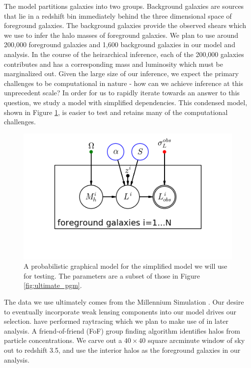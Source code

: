 \documentclass[\docopts]{\docclass}
\begin{document}
The model partitions galaxies into two groups. 
Background galaxies are sources that lie in a redshift bin immediately behind the three dimensional space of foreground galaxies. 
The background galaxies provide the observed shears which we use to infer the halo masses of foreground galaxies. 
We plan to use around 200,000 foreground galaxies and 1,600 background galaxies in our model and analysis. 
In the course of the heirarchical inference, each of the 200,000 galaxies contributes and has a corresponding mass and luminosity which must be marginalized out. 
Given the large size of our inference, we expect the primary challenges to be computational in nature - how can we achieve inference at this unprecedent scale?
In order for us to rapidly iterate towards an answer to this question, we study a model with simplified dependencies.
This condensed model, shown in Figure \ref{fig:simplified_pgm}, is easier to test and retains many of the computational challenges. 

\begin{figure}[h]
\centering
\includegraphics[width=0.9\columnwidth]{simplified_pgm.png}
\caption{
A probabilistic graphical model for the simplified model we will use for testing.
The parameters are a subset of those in Figure \ref{fig:ultimate_pgm}.
\label{fig:simplified_pgm}}
\end{figure}

The data we use ultimately comes from the Millennium Simulation \citep{millennium}. 
Our desire to eventually incorporate weak lensing components into our model drives our selection. 
\citet{raytracing} have performed raytracing which we plan to make use of in later analysis. 
A friend-of-friend (FoF) group finding algorithm identifies halos from particle concentrations. 
We carve out a $40 \times 40$ square arcminute window of sky out to redshift 3.5, and use the interior halos as the foreground galaxies in our analysis.  
\end{document}
